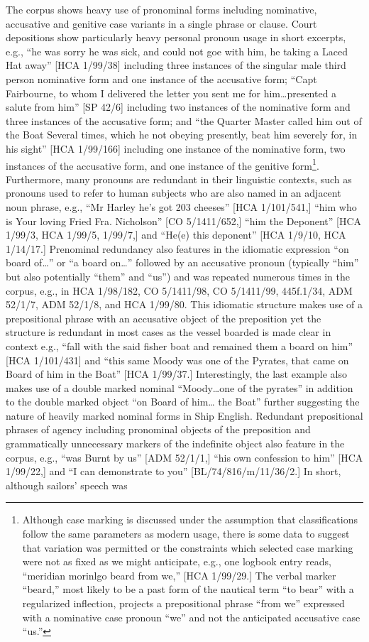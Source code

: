\begin{styleStandard}
The corpus shows heavy use of pronominal forms including nominative, accusative and genitive case variants in a single phrase or clause. Court depositions show particularly heavy personal pronoun usage in short excerpts, e.g., “he was sorry he was sick, and could not goe with him, he taking a Laced Hat away” [HCA 1/99/38] including three instances of the singular male third person nominative form and one instance of the accusative form; “Capt Fairbourne, to whom I delivered the letter you sent me for him…presented a salute from him” [SP 42/6] including two instances of the nominative form and three instances of the accusative form; and “the Quarter Master called him out of the Boat Several times, which he not obeying presently, beat him severely for, in his sight” [HCA 1/99/166] including one instance of the nominative form, two instances of the accusative form, and one instance of the genitive form\footnote{ Although case marking is discussed under the assumption that classifications follow the same parameters as modern usage, there is some data to suggest that variation was permitted or the constraints which selected case marking were not as fixed as we might anticipate, e.g., one logbook entry reads, “meridian morinlgo beard from we,” [HCA 1/99/29.] The verbal marker “beard,” most likely to be a past form of the nautical term “to bear” with a regularized inflection, projects a prepositional phrase “from we” expressed with a nominative case pronoun “we” and not the anticipated accusative case “us.” }. Furthermore, many pronouns are redundant in their linguistic contexts, such as pronouns used to refer to human subjects who are also named in an adjacent noun phrase, e.g., “Mr Harley he’s got 203 cheeses” [HCA 1/101/541,] “him who is Your loving Fried Fra. Nicholson” [CO 5/1411/652,] “him the Deponent” [HCA 1/99/3, HCA 1/99/5, 1/99/7,] and “He(e) this deponent” [HCA 1/9/10, HCA 1/14/17.] Prenominal redundancy also features in the idiomatic expression “on board of…” or “a board on…” followed by an accusative pronoun (typically “him” but also potentially “them” and “us”) and was repeated numerous times in the corpus, e.g., in HCA 1/98/182, CO 5/1411/98, CO 5/1411/99, 445f.1/34, ADM 52/1/7, ADM 52/1/8, and HCA 1/99/80. This idiomatic structure makes use of a prepositional phrase with an accusative object of the preposition yet the structure is redundant in most cases as the vessel boarded is made clear in context e.g., “fall with the said fisher boat and remained them a board on him” [HCA 1/101/431] and “this same Moody was one of the Pyrates, that came on Board of him in the Boat” [HCA 1/99/37.] Interestingly, the last example also makes use of a double marked nominal “Moody…one of the pyrates” in addition to the double marked object “on Board of him… the Boat” further suggesting the nature of heavily marked nominal forms in Ship English. Redundant prepositional phrases of agency including pronominal objects of the preposition and grammatically unnecessary markers of the indefinite object also feature in the corpus, e.g., “was Burnt by us” [ADM 52/1/1,] “his own confession to him” [HCA 1/99/22,] and “I can demonstrate to you” [BL/74/816/m/11/36/2.] In short, although sailors’ speech was 
\end{styleStandard}
